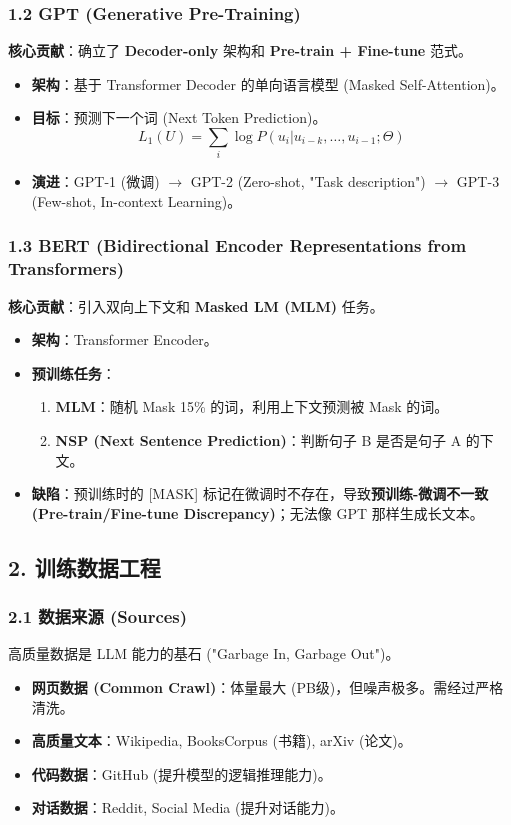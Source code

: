 \documentclass[a4paper, 11pt]{ctexart}
\begin{document}
\subsubsection{1.2 GPT (Generative Pre-Training)}
\textbf{核心贡献}：确立了 \textbf{Decoder-only} 架构和 \textbf{Pre-train + Fine-tune} 范式。
\begin{itemize}
    \item \textbf{架构}：基于 Transformer Decoder 的单向语言模型 (Masked Self-Attention)。
    \item \textbf{目标}：预测下一个词 (Next Token Prediction)。
    $$ L_1(U) = \sum_i \log P(u_i | u_{i-k}, \dots, u_{i-1}; \Theta) $$
    \item \textbf{演进}：GPT-1 (微调) $\to$ GPT-2 (Zero-shot, "Task description") $\to$ GPT-3 (Few-shot, In-context Learning)。
\end{itemize}

\subsubsection{1.3 BERT (Bidirectional Encoder Representations from Transformers)}
\textbf{核心贡献}：引入双向上下文和 \textbf{Masked LM (MLM)} 任务。
\begin{itemize}
    \item \textbf{架构}：Transformer Encoder。
    \item \textbf{预训练任务}：
    \begin{enumerate}
        \item \textbf{MLM}：随机 Mask 15\% 的词，利用上下文预测被 Mask 的词。
        \item \textbf{NSP (Next Sentence Prediction)}：判断句子 B 是否是句子 A 的下文。
    \end{enumerate}
    \item \textbf{缺陷}：预训练时的 [MASK] 标记在微调时不存在，导致\textbf{预训练-微调不一致 (Pre-train/Fine-tune Discrepancy)}；无法像 GPT 那样生成长文本。
\end{itemize}

\subsection{2. 训练数据工程}

\subsubsection{2.1 数据来源 (Sources)}
高质量数据是 LLM 能力的基石 ("Garbage In, Garbage Out")。
\begin{itemize}
    \item \textbf{网页数据 (Common Crawl)}：体量最大 (PB级)，但噪声极多。需经过严格清洗。
    \item \textbf{高质量文本}：Wikipedia, BooksCorpus (书籍), arXiv (论文)。
    \item \textbf{代码数据}：GitHub (提升模型的逻辑推理能力)。
    \item \textbf{对话数据}：Reddit, Social Media (提升对话能力)。
\end{itemize}
\end{document}
